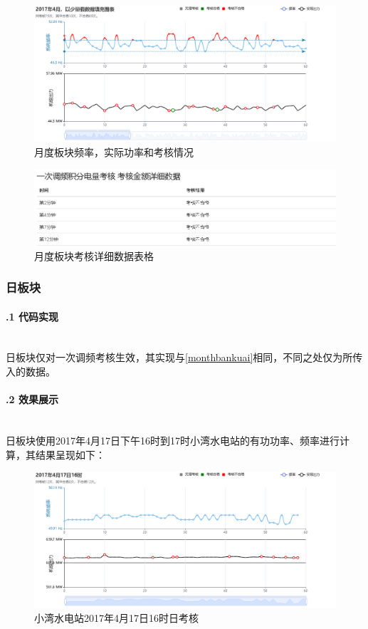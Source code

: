 \documentclass[winfonts,UTF8,a4paper]{ctexart}
\begin{document}
\begin{enumerate}
	
	\begin{figure}[H]
		\centering
		\includegraphics[width=0.7\linewidth]{pic/2017年4月，以少量假数据填充图表}
		\caption{月度板块频率，实际功率和考核情况}
		\label{fig:20174}
	\end{figure}
	\begin{figure}[H]
		\centering
		\includegraphics[width=0.7\linewidth]{pic/screenshot023}
		\caption{月度板块考核详细数据表格}
		\label{fig:screenshot023}
	\end{figure}
\end{enumerate}
\subsubsection{日板块}
\paragraph{\thesubsubsection.1 代码实现}\ \\
日板块仅对一次调频考核生效，其实现与\ref{monthbankuai}相同，不同之处仅为所传入的数据。
\paragraph{\thesubsubsection.2 效果展示}\ \\

日板块使用2017年4月17日下午16时到17时小湾水电站的有功功率、频率进行计算，其结果呈现如下：
\begin{figure}[H]
	\centering
	\includegraphics[width=0.7\linewidth]{pic/2017年4月17日16时}
	\caption{小湾水电站2017年4月17日16时日考核}
	\label{fig:201741716}
\end{figure}
\end{document}
